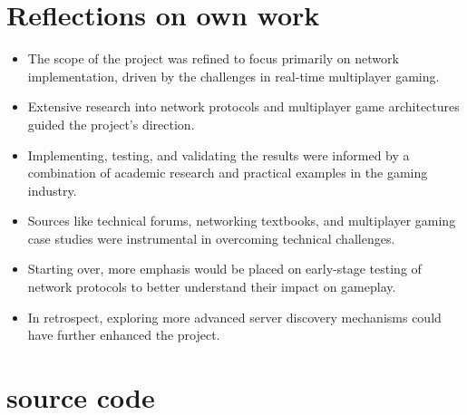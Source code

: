 \section{Reflections on own work}
\label{chap:reflection}
\begin{itemize}
    \item The scope of the project was refined to focus primarily on network implementation, driven by the challenges in real-time multiplayer gaming.
    \item Extensive research into network protocols and multiplayer game architectures guided the project's direction.
    \item Implementing, testing, and validating the results were informed by a combination of academic research and practical examples in the gaming industry.
    \item Sources like technical forums, networking textbooks, and multiplayer gaming case studies were instrumental in overcoming technical challenges.
    \item Starting over, more emphasis would be placed on early-stage testing of network protocols to better understand their impact on gameplay.
    \item In retrospect, exploring more advanced server discovery mechanisms could have further enhanced the project.
\end{itemize}



\section{source code}


